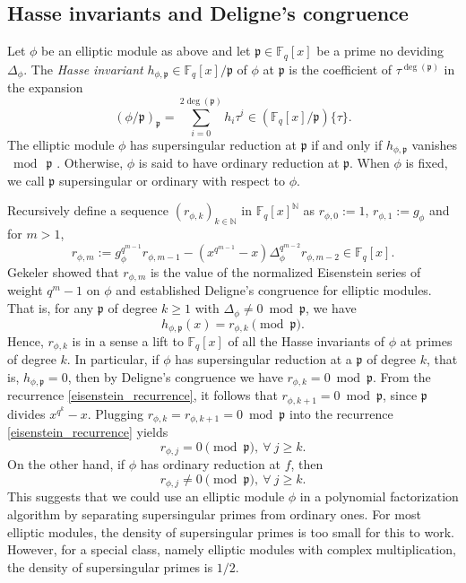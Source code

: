 \documentclass[12pt]{article}
\theoremstyle{plain}
\theoremstyle{definition}
\def\F{\ensuremath{\mathbb{F}}}
\newcommand{\D}{\Delta}
\newcommand{\ph}{(\phi/\p)}
\newcommand{\p}{\mathfrak p}
\begin{document}
\subsection{Hasse invariants and Deligne's congruence}

Let $\phi$ be an elliptic module as above and let $\p \in \F_q[x]$ be a prime no deviding  
$\Delta_\phi$. The \textit{Hasse invariant} $h_{\phi,\p} \in \F_q[x]/\p$ of $\phi$ at $\p$ is the 
coefficient of $\tau^{\deg(\p)}$ in the expansion 
\[ \ph_\p = \sum_{i=0}^{2\deg(\p)} h_i \tau^i \in (\F_{q}[x]/\p)\{\tau\}. \]
The elliptic module $\phi$ has supersingular reduction at $\p$ if and only if $h_{\phi, \p}$ 
vanishes $\bmod ~\p$ \cite{gos}. Otherwise, $\phi$ is said to have ordinary reduction at $\p$. When 
$\phi$ is fixed, we call $\p$ supersingular or ordinary with respect to $\phi$.

Recursively define a sequence $(r_{\phi,k})_{k \in \mathbb{N}}$ in $\F_q[x]^\mathbb{N}$ as 
$r_{\phi,0}:=1$, $r_{\phi,1}:=g_\phi$ and for $m>1$,
\begin{equation}
\label{eisenstein_recurrence}
	r_{\phi,m} := g_\phi^{q^{m-1}}r_{\phi,m-1} - (x^{q^{m-1}}-x)\D_\phi^{q^{m-2}} r_{\phi,m-2} \in 
	\F_q[x].
\end{equation}
Gekeler \cite[Eq 3.6, Prop 3.7]{gek} showed that $r_{\phi,m}$ is the value of the normalized 
Eisenstein series of weight $q^{m}-1$ on $\phi$ and established Deligne's congruence for elliptic 
modules. That is, for any $\p$ of degree $k \geq 1$ with $\Delta_\phi \neq 0 \bmod \p$, we have
\begin{equation}
\label{deligne_congruence}
	h_{\phi, \p}(x) = r_{\phi,k} \pmod{\p}.
\end{equation}
Hence, $r_{\phi,k}$ is in a sense a lift to $\F_q[x]$ of all the Hasse invariants of $\phi$ at 
primes of degree $k$. In particular, if $\phi$ has supersingular reduction at a $\p$ of degree $k$, 
that is, $h_{\phi, \p} = 0$, then by Deligne's congruence we have $r_{\phi,k} = 0 \bmod \p$. From 
the recurrence \eqref{eisenstein_recurrence}, it follows that $r_{\phi,k+1} = 0 \bmod \p$, since 
$\p$ divides $x^{q^k} - x$. Plugging $r_{\phi,k} = r_{\phi,k+1} = 0 \bmod \p$  into the 
recurrence \eqref{eisenstein_recurrence} yields
\begin{equation}
\label{supersingular_zero}
	r_{\phi,j} = 0 \pmod{\p}, ~ \forall~j \ge k.
\end{equation}
On the other hand, if $\phi$ has ordinary reduction at $f$, then \cite[Lemma~2.3]{cor}
\begin{equation}
\label{supersingular_nonzero}
	r_{\phi,j} \neq 0 \pmod{\p}, ~ \forall~j \ge k.
\end{equation}
This suggests that we could use an elliptic module $\phi$ in a polynomial factorization algorithm 
by separating supersingular primes from ordinary ones. For most elliptic modules, the density of 
supersingular primes is too small for this to work. However, for a special class, namely elliptic 
modules with complex multiplication, the density of supersingular primes is $1/2$. 
\end{document}
